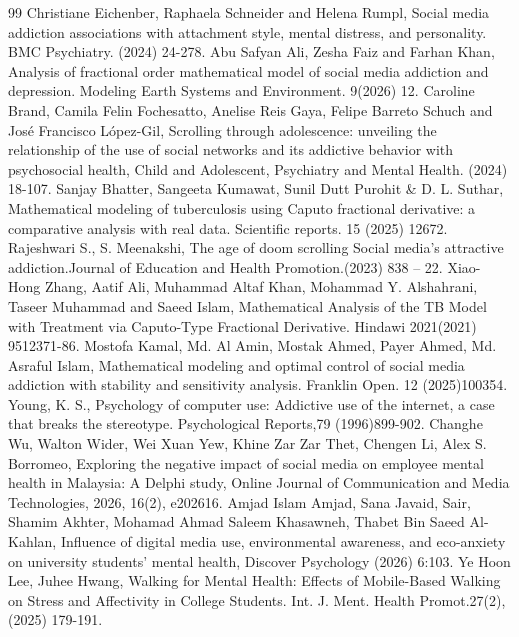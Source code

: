 \documentclass[10pt]{article}
\begin{document}
	\begin{thebibliography}{99}
		 Christiane Eichenber, Raphaela Schneider and Helena Rumpl, Social media addiction associations with attachment style, mental distress, and personality. BMC Psychiatry. (2024) 24-278.
		 Abu Safyan Ali, Zesha Faiz and Farhan Khan, Analysis of fractional order mathematical model of social media addiction and depression. Modeling Earth Systems and Environment. 9(2026) 12.
		 Caroline Brand, Camila Felin Fochesatto, Anelise Reis Gaya, Felipe Barreto Schuch and José Francisco López-Gil, Scrolling through adolescence: unveiling the relationship of the use of social networks and its addictive behavior with psychosocial health, Child and Adolescent, Psychiatry and Mental Health. (2024) 18-107.
		 Sanjay Bhatter, Sangeeta Kumawat, Sunil Dutt Purohit \& D. L. Suthar, Mathematical modeling of tuberculosis using Caputo fractional derivative: a comparative analysis with real data. Scientific reports. 15 (2025) 12672.
		 Rajeshwari S., S. Meenakshi, The age of doom scrolling Social media's attractive addiction.Journal of Education and Health Promotion.(2023) 838 – 22.
		 Xiao-Hong Zhang, Aatif Ali, Muhammad Altaf Khan, Mohammad Y. Alshahrani, Taseer Muhammad and Saeed Islam, Mathematical Analysis of the TB Model with Treatment via Caputo-Type Fractional Derivative. Hindawi 2021(2021) 9512371-86.
		 Mostofa Kamal, Md. Al Amin, Mostak Ahmed, Payer Ahmed, Md. Asraful Islam, Mathematical modeling and optimal control of social media addiction with stability and sensitivity analysis. Franklin Open. 12 (2025)100354.
		 Young, K. S., Psychology of computer use: Addictive use of the internet, a case that breaks the stereotype. Psychological Reports,79 (1996)899-902.
		 Changhe Wu, Walton Wider, Wei Xuan Yew, Khine Zar Zar Thet, Chengen Li, Alex S. Borromeo, Exploring the negative impact of social media on employee mental health in Malaysia: A Delphi study, Online Journal of Communication and Media Technologies, 2026, 16(2), e202616.
		 Amjad Islam Amjad, Sana Javaid, Sair, Shamim Akhter, Mohamad Ahmad Saleem Khasawneh, Thabet Bin Saeed Al-Kahlan, Influence of digital media use, environmental awareness, and eco-anxiety on university students' mental health, Discover Psychology (2026) 6:103.
		 Ye Hoon Lee, Juhee Hwang, Walking for Mental Health: Effects of Mobile-Based Walking on Stress and Affectivity in College Students. Int. J. Ment. Health Promot.27(2), (2025) 179-191.

\end{thebibliography}
\end{document}
